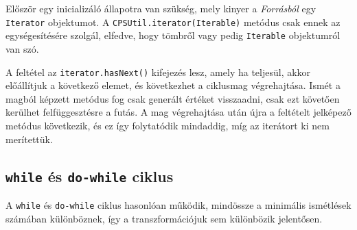 Először egy inicializáló állapotra van szükség, mely kinyer a \textit{Forrásból} egy \texttt{Iterator} objektumot. A \texttt{CPSUtil.iterator(Iterable)} metódus csak ennek az egységesítésére szolgál, elfedve, hogy tömbről vagy pedig \texttt{Iterable} objektumról van szó. 

A feltétel az \texttt{iterator.hasNext()} kifejezés lesz, amely ha teljesül, akkor előállítjuk a következő elemet, és következhet a ciklusmag végrehajtása. Ismét a magból képzett metódus fog csak generált értéket visszaadni, csak ezt követően kerülhet felfüggesztésre a futás. A mag végrehajtása után újra a feltételt jelképező metódus következik, és ez így folytatódik mindaddig, míg az iterátort ki nem merítettük.

\subsection{\texttt{while} és \texttt{do-while} ciklus}

A \texttt{while} és \texttt{do-while} ciklus hasonlóan működik, mindössze a minimális ismétlések számában különböznek, így a transzformációjuk sem különbözik jelentősen.

